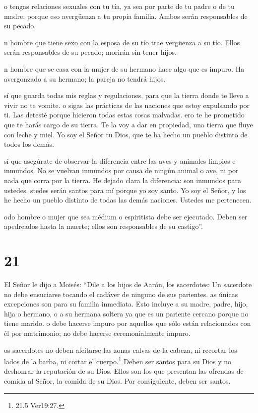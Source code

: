  o tengas relaciones sexuales con tu tía, ya sea por parte
de tu padre o de tu madre, porque eso avergüenza a tu propia familia.
Ambos serán responsables de su pecado.

 n hombre que tiene sexo con la esposa de su tío trae
vergüenza a su tío. Ellos serán responsables de su pecado; morirán sin
tener hijos.

 n hombre que se casa con la mujer de su hermano hace algo
que es impuro. Ha avergonzado a su hermano; la pareja no tendrá hijos.

 sí que guarda todas mis reglas y regulaciones, para que la
tierra donde te llevo a vivir no te vomite.  o sigas las
prácticas de las naciones que estoy expulsando por ti. Las detesté
porque hicieron todas estas cosas malvadas.  ero te he
prometido que te harás cargo de su tierra. Te la voy a dar en propiedad,
una tierra que fluye con leche y miel. Yo soy el Señor tu Dios, que te
ha hecho un pueblo distinto de todos los demás.

 sí que asegúrate de observar la diferencia entre las aves
y animales limpios e inmundos. No se vuelvan inmundos por causa de
ningún animal o ave, ni por nada que corra por la tierra. He dejado
clara la diferencia: son inmundos para ustedes.  stedes
serán santos para mí porque yo soy santo. Yo soy el Señor, y los he
hecho un pueblo distinto de todas las demás naciones. Ustedes me
pertenecen.

 odo hombre o mujer que sea médium o espiritista debe ser
ejecutado. Deben ser apedreados hasta la muerte; ellos son responsables
de su castigo''.

\hypertarget{section-20}{%
\section{21}\label{section-20}}

 El Señor le dijo a Moisés: ``Dile a los hijos de Aarón, los
sacerdotes: Un sacerdote no debe ensuciarse tocando el cadáver de
ninguno de sus parientes.  as únicas excepciones son para su
familia inmediata. Esto incluye a su madre, padre, hijo, hija o hermano,
 o a su hermana soltera ya que es un pariente cercano porque
no tiene marido.  o debe hacerse impuro por aquellos que
sólo están relacionados con él por matrimonio; no debe hacerse
ceremonialmente impuro.

 os sacerdotes no deben afeitarse las zonas calvas de la
cabeza, ni recortar los lados de la barba, ni cortar el
cuerpo.\footnote{21.5 Ver19:27.}  Deben ser santos para su
Dios y no deshonrar la reputación de su Dios. Ellos son los que
presentan las ofrendas de comida al Señor, la comida de su Dios. Por
consiguiente, deben ser santos.

